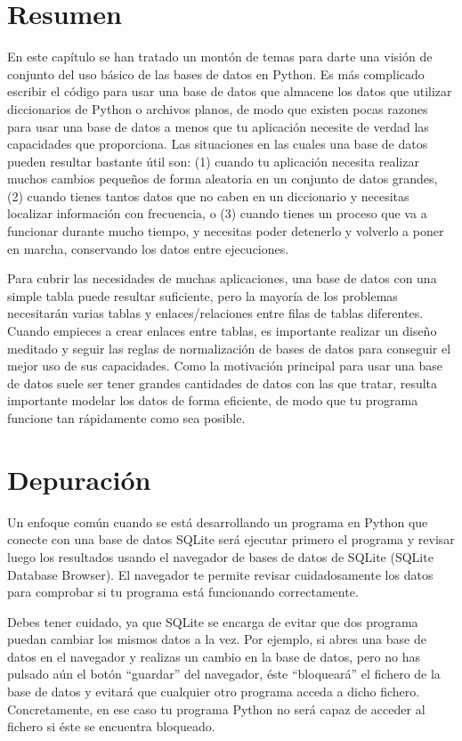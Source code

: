 \section{Resumen}

En este capítulo se han tratado un montón de temas para darte una visión de conjunto del uso básico
de las bases de datos en Python. Es más complicado escribir el código para usar una base
de datos que almacene los datos que utilizar diccionarios de Python o archivos planos, de modo que
existen pocas razones para usar una base de datos a menos que tu aplicación necesite de verdad
las capacidades que proporciona. Las situaciones en las cuales una base de datos pueden resultar
bastante útil son:
(1) cuando tu aplicación necesita realizar muchos cambios pequeños de forma aleatoria en un conjunto
de datos grandes,
(2) cuando tienes tantos datos que no caben en un diccionario y necesitas localizar
información con frecuencia, o
(3) cuando tienes un proceso que va a funcionar durante mucho tiempo, y necesitas poder
detenerlo y volverlo a poner en marcha, conservando los datos entre ejecuciones.

Para cubrir las necesidades de muchas aplicaciones, una base de datos con una simple tabla puede
resultar suficiente, pero la mayoría de los problemas necesitarán varias tablas y enlaces/relaciones
entre filas de tablas diferentes. Cuando empieces a crear enlaces entre tablas,
es importante realizar un diseño meditado y seguir las
reglas de normalización de bases de datos para conseguir el mejor uso de sus capacidades.
Como la motivación principal para usar una base de datos
suele ser tener grandes cantidades de datos con las que tratar, resulta importante
modelar los datos de forma eficiente, de modo que tu programa funcione tan rápidamente como sea
posible. 

\section{Depuración}

Un enfoque común cuando se está desarrollando un programa en Python que conecte con
una base de datos SQLite será ejecutar primero el programa y revisar luego los
resultados usando el navegador de bases de datos de SQLite (SQLite Database Browser). El navegador
te permite revisar cuidadosamente los datos para comprobar si tu programa está funcionando
correctamente.

Debes tener cuidado, ya que SQLite se encarga de evitar que dos programa puedan
cambiar los mismos datos a la vez. Por ejemplo, si abres
una base de datos en el navegador y realizas un cambio en la base de datos,
pero no has pulsado aún el botón ``guardar'' del navegador, éste
``bloqueará'' el fichero de la base de datos y evitará que cualquier otro programa
acceda a dicho fichero. Concretamente, en ese caso tu programa Python
no será capaz de acceder al fichero si éste se encuentra bloqueado.

